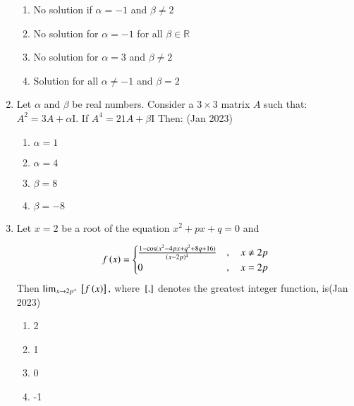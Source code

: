 \documentclass[journal,12pt,onecolumn]{IEEEtran}
\theoremstyle{remark}
\begin{document}
\begin{enumerate}
   \begin{enumerate}
       \item No solution if $\alpha = -1$  and $\beta \neq 2$
       \item No solution for $\alpha = -1$ for all $\beta \in \mathbb{R}$
       \item No solution for $\alpha = 3$ and $\beta \neq 2$
       \item Solution for all $\alpha \neq -1$ and $\beta = 2$
   \end{enumerate}

\item Let $\alpha$ and $\beta$ be real numbers. Consider a $ 3 \times 3$ matrix $A$ such that: $A^2 = 3A + \alpha$I. If $A^4 = 21A + \beta$I   Then: \hfill(Jan 2023)
\begin{multicols}{4}
   \begin{enumerate}
       \item $\alpha = 1$
       \item $\alpha = 4$
       \item $\beta = 8$
       \item $\beta = -8$
   \end{enumerate}
\end{multicols}
\item Let \( x = 2 \) be a root of the equation $x^2 + px + q = 0$ and 

\begin{align*}
f\left(x\right) = 
\begin{cases} 
\frac{1 - \cos(x^2 - 4px + q^2 + 8q + 16)}{(x - 2p)^4} &, \quad x \neq 2p \\
0 &, \quad x = 2p 
\end{cases}
\end{align*}
Then  $\lim_{x \to 2p^+} {}\left[f\left(x\right)\right],$ where ${}\left[.\right]$ denotes the greatest integer function, is\hfill(Jan 2023)
\begin{multicols}{4}
    \begin{enumerate}
    \item 2 
    \item 1
    \item 0 
    \item -1
\end{enumerate}
\end{multicols}


\end{enumerate}
\end{document}
